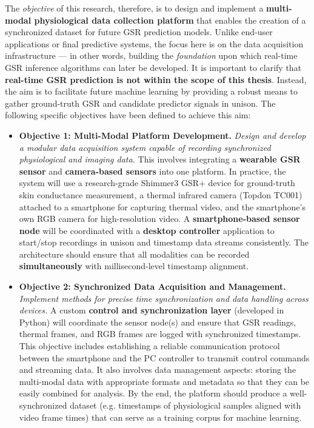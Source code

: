 The \textit{objective} of this research, therefore, is to design and implement
a \textbf{multi-modal physiological data collection platform} that enables
the creation of a synchronized dataset for future GSR prediction models.
Unlike end-user applications or final predictive systems, the focus here
is on the data acquisition infrastructure --- in other words, building
the \textit{foundation} upon which real-time GSR inference algorithms can later
be developed. It is important to clarify that \textbf{real-time GSR prediction
is not within the scope of this thesis}. Instead, the aim is to
facilitate future machine learning by providing a robust means to gather
ground-truth GSR and candidate predictor signals in unison. The
following specific objectives have been defined to achieve this aim:

\begin{itemize}
\item \textbf{Objective 1: Multi-Modal Platform Development.} \textit{Design and develop
  a modular data acquisition system capable of recording synchronized
  physiological and imaging data.} This involves integrating a
  \textbf{wearable GSR sensor} and \textbf{camera-based sensors} into one
  platform. In practice, the system will use a research-grade Shimmer3
  GSR+ device for ground-truth skin conductance
  measurement\cite{GSRPPGMachineLearning2024},
  a thermal infrared camera (Topdon TC001) attached to a smartphone for
  capturing thermal
  video\cite{GSRPPGMachineLearning2024},
  and the smartphone's own RGB camera for high-resolution video. A
  \textbf{smartphone-based sensor node} will be coordinated with a \textbf{desktop
  controller} application to start/stop recordings in unison and
  timestamp data streams consistently. The architecture should ensure
  that all modalities can be recorded \textbf{simultaneously} with
  millisecond-level timestamp alignment.

\item \textbf{Objective 2: Synchronized Data Acquisition and Management.}
  \textit{Implement methods for precise time synchronization and data handling
  across devices.} A custom \textbf{control and synchronization layer}
  (developed in Python) will coordinate the sensor node(s) and ensure
  that GSR readings, thermal frames, and RGB frames are logged with
  synchronized timestamps. This objective includes establishing a
  reliable communication protocol between the smartphone and the PC
  controller to transmit control commands and streaming
  data\cite{SimulatorValidityPhysiological2025}.
  It also involves data management aspects: storing the multi-modal data
  with appropriate formats and metadata so that they can be easily
  combined for analysis. By the end, the platform should produce a
  well-synchronized dataset (e.g. timestamps of physiological samples
  aligned with video frame times) that can serve as a training corpus
  for machine learning.


\end{itemize}
